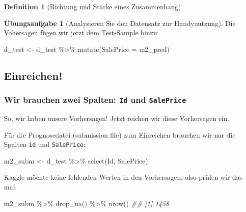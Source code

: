 \documentclass[
  a4paper,
  DIV=11]{scrreprt}
\newenvironment{Shaded}{\begin{snugshade}}{\end{snugshade}}
\newcommand{\AttributeTok}[1]{\textcolor[rgb]{0.40,0.45,0.13}{#1}}
\newcommand{\DocumentationTok}[1]{\textcolor[rgb]{0.37,0.37,0.37}{\textit{#1}}}
\newcommand{\FunctionTok}[1]{\textcolor[rgb]{0.28,0.35,0.67}{#1}}
\newcommand{\NormalTok}[1]{\textcolor[rgb]{0.00,0.23,0.31}{#1}}
\newcommand{\OtherTok}[1]{\textcolor[rgb]{0.00,0.23,0.31}{#1}}
\newcommand{\SpecialCharTok}[1]{\textcolor[rgb]{0.37,0.37,0.37}{#1}}
\theoremstyle{definition}
\newtheorem{exercise}{Übungsaufgabe}[chapter]
\theoremstyle{definition}
\theoremstyle{definition}
\newtheorem{definition}{Definition}[chapter]
\theoremstyle{remark}
\newcommand*\circled[1]{\tikz[baseline=(char.base)]{
          \node[shape=circle,draw,inner sep=1pt] (char) {{\scriptsize#1}};}}
\begin{document}
\begin{definition}[Richtung und Stärke eines
Zusammenhang]
\begin{exercise}[Analysieren Sie den Datensatz zur
Handynutzung]
Die Vohersagen fügen wir jetzt dem Test-Sample hinzu:

\begin{Shaded}
\begin{Highlighting}[]
\NormalTok{d\_test }\OtherTok{\textless{}{-}} 
\NormalTok{  d\_test }\SpecialCharTok{\%\textgreater{}\%} 
  \FunctionTok{mutate}\NormalTok{(}\AttributeTok{SalePrice =}\NormalTok{ m2\_pred)}
\end{Highlighting}
\end{Shaded}

\subsection{Einreichen!}\label{einreichen}

\subsubsection{\texorpdfstring{Wir brauchen zwei Spalten: \texttt{Id}
und
\texttt{SalePrice}}{Wir brauchen zwei Spalten: Id und SalePrice}}\label{wir-brauchen-zwei-spalten-id-und-saleprice}

So, wir haben unsere Vorhersagen! Jetzt reichen wir diese Vorhersagen
ein.

Für die Prognosedatei (submission file) zum Einreichen brauchen wir nur
die Spalten \texttt{id} und \texttt{SalePrice}:

\begin{Shaded}
\begin{Highlighting}[]
\NormalTok{m2\_subm }\OtherTok{\textless{}{-}}
\NormalTok{  d\_test }\SpecialCharTok{\%\textgreater{}\%} 
  \FunctionTok{select}\NormalTok{(Id, SalePrice)}
\end{Highlighting}
\end{Shaded}

Kaggle möchte keine fehlenden Werten in den Vorhersagen, also prüfen wir
das mal:

\label{annotated-cell-168}%
\begin{Shaded}
\begin{Highlighting}[]
\NormalTok{m2\_subm }\SpecialCharTok{\%\textgreater{}\%} 
  \FunctionTok{drop\_na}\NormalTok{() }\SpecialCharTok{\%\textgreater{}\%} \hspace*{\fill}\NormalTok{\circled{1}}
  \FunctionTok{nrow}\NormalTok{() }\hspace*{\fill}\NormalTok{\circled{2}}
\DocumentationTok{\#\# [1] 1458}
\end{Highlighting}
\end{Shaded}


\end{exercise}
\end{definition}
\end{document}
